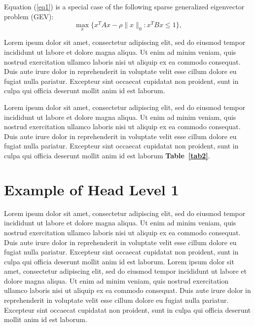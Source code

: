 \documentclass[english]{sbc2025}%
\begin{document}
Equation (\ref{eq1}) is a special case of the following sparse generalized eigenvector problem (GEV):
\begin{equation}\label{GEV}
\max\limits_{x}\{x^TAx-\rho \|x\|_0: x^TBx\leq 1\},
\end{equation}

Lorem ipsum dolor sit amet, consectetur adipiscing elit, sed do eiusmod tempor incididunt ut labore et dolore magna aliqua. Ut enim ad minim veniam, quis nostrud exercitation ullamco laboris nisi ut aliquip ex ea commodo consequat. Duis aute irure dolor in reprehenderit in voluptate velit esse cillum dolore eu fugiat nulla pariatur. Excepteur sint occaecat cupidatat non proident, sunt in culpa qui officia deserunt mollit anim id est laborum. 

Lorem ipsum dolor sit amet, consectetur adipiscing elit, sed do eiusmod tempor incididunt ut labore et dolore magna aliqua. Ut enim ad minim veniam, quis nostrud exercitation ullamco laboris nisi ut aliquip ex ea commodo consequat. Duis aute irure dolor in reprehenderit in voluptate velit esse cillum dolore eu fugiat nulla pariatur. Excepteur sint occaecat cupidatat non proident, sunt in culpa qui officia deserunt mollit anim id est laborum \textbf{Table~\ref{tab2}}.

\section{Example of Head Level 1}

Lorem ipsum dolor sit amet, consectetur adipiscing elit, sed do eiusmod tempor incididunt ut labore et dolore magna aliqua. Ut enim ad minim veniam, quis nostrud exercitation ullamco laboris nisi ut aliquip ex ea commodo consequat. Duis aute irure dolor in reprehenderit in voluptate velit esse cillum dolore eu fugiat nulla pariatur. Excepteur sint occaecat cupidatat non proident, sunt in culpa qui officia deserunt mollit anim id est laborum. Lorem ipsum dolor sit amet, consectetur adipiscing elit, sed do eiusmod tempor incididunt ut labore et dolore magna aliqua. Ut enim ad minim veniam, quis nostrud exercitation ullamco laboris nisi ut aliquip ex ea commodo consequat. Duis aute irure dolor in reprehenderit in voluptate velit esse cillum dolore eu fugiat nulla pariatur. Excepteur sint occaecat cupidatat non proident, sunt in culpa qui officia deserunt mollit anim id est laborum.
\end{document}
